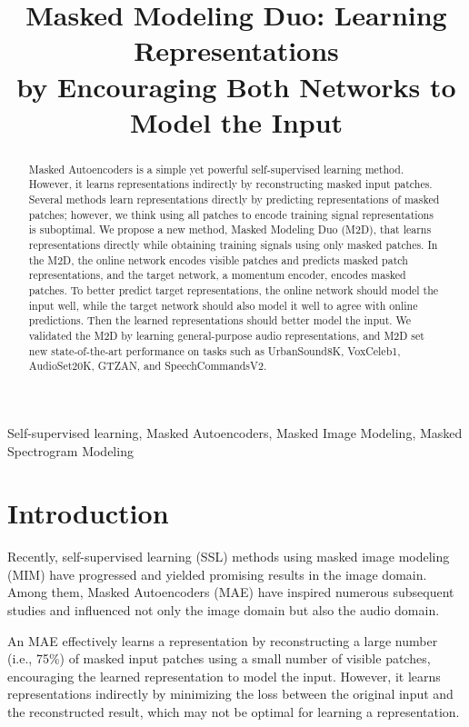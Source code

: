 \documentclass{article}
\title{Masked Modeling Duo: Learning Representations\\ by Encouraging Both Networks to Model the Input}
\begin{document}
\ninept
\maketitle
\begin{abstract} Masked Autoencoders is a simple yet powerful self-supervised learning method. However, it learns representations indirectly by reconstructing masked input patches.
Several methods learn representations directly by predicting representations of masked patches; however, we think using all patches to encode training signal representations is suboptimal.
We propose a new method, Masked Modeling Duo (M2D), that learns representations directly while obtaining training signals using only masked patches.
In the M2D, the online network encodes visible patches and predicts masked patch representations, and the target network, a momentum encoder, encodes masked patches.
To better predict target representations, the online network should model the input well, while the target network should also model it well to agree with online predictions.
Then the learned representations should better model the input.
We validated the M2D by learning general-purpose audio representations, and M2D set new state-of-the-art performance on tasks such as UrbanSound8K, VoxCeleb1, AudioSet20K, GTZAN, and SpeechCommandsV2.
\end{abstract}



\begin{keywords} Self-supervised learning, Masked Autoencoders, Masked Image Modeling, Masked Spectrogram Modeling
\end{keywords}

\section{Introduction}
\label{sec:intro}


Recently, self-supervised learning (SSL) methods using masked image modeling (MIM) have progressed and yielded promising results in the image domain.
Among them, Masked Autoencoders\cite{he2022masked} (MAE) have inspired numerous subsequent studies and influenced not only the image domain\cite{tao2022MIM:SIM,assran2022MIM:MSN,chen2022MIM:CAE,elnouby2021MIM:SplitMask} but also the audio domain\cite{huang2022maskedlisten,Baade2022MAE-AST,chong2022maskspec,niizumi2022msm-mae}.


An MAE effectively learns a representation by reconstructing a large number (i.e., 75\%) of masked input patches using a small number of visible patches, encouraging the learned representation to model the input. However, it learns representations indirectly by minimizing the loss between the original input and the reconstructed result, which may not be optimal for learning a representation.
\end{document}
